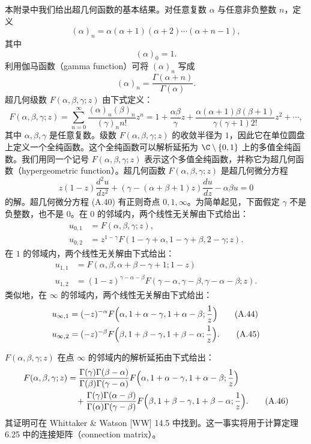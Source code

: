 
本附录中我们给出超几何函数的基本结果。对任意复数 $\alpha$ 与任意非负整数 $n$，定义
\[
(\alpha)_n=\alpha(\alpha+1)(\alpha+2)\cdots(\alpha+n-1),
\]
其中
\[
(\alpha)_0=1.
\]
利用伽马函数（gamma function）可将 $(\alpha)_n$ 写成
\[
(\alpha)_n=\frac{\Gamma(\alpha+n)}{\Gamma(\alpha)}.
\]
超几何级数 $F(\alpha,\beta,\gamma;z)$ 由下式定义：
\begin{equation}
F(\alpha,\beta,\gamma;z)=\sum_{n=0}^{\infty}\frac{(\alpha)_n(\beta)_n}{(\gamma)_nn!}z^n=1+\frac{\alpha\beta}{\gamma}z+\frac{\alpha(\alpha+1)\beta(\beta+1)}{\gamma(\gamma+1)2!}z^2+\cdots,\tag{A.39}
\end{equation}
其中 $\alpha,\beta,\gamma$ 是任意复数。级数 $F(\alpha,\beta,\gamma;z)$ 的收敛半径为 $1$，因此它在单位圆盘上定义一个全纯函数。这个全纯函数可以解析延拓为 $\C\setminus\{0,1\}$ 上的多值全纯函数。我们用同一个记号 $F(\alpha,\beta,\gamma;z)$ 表示这个多值全纯函数，并称它为超几何函数（hypergeometric function）。超几何函数 $F(\alpha,\beta,\gamma;z)$ 是超几何微分方程
\begin{equation}
z(1-z)\frac{d^2u}{dz^2}+(\gamma-(\alpha+\beta+1)z)\frac{du}{dz}-\alpha\beta u=0\tag{A.40}
\end{equation}
的解。超几何微分方程 (A.40) 有正则奇点 $0,1,\infty$。为简单起见，下面假定 $\gamma$ 不是负整数，也不是 $0$。在 $0$ 的邻域内，两个线性无关解由下式给出：
\begin{align}
u_{0,1}&=F(\alpha,\beta,\gamma;z),\nonumber\\
u_{0,2}&=z^{1-\gamma}F(1-\gamma+\alpha,1-\gamma+\beta,2-\gamma;z).\tag{A.41}
\end{align}
在 $1$ 的邻域内，两个线性无关解由下式给出：
\begin{align}
u_{1,1}&=F(\alpha,\beta,\alpha+\beta-\gamma+1;1-z)\tag{A.42}\\
u_{1,2}&=(1-z)^{\gamma-\alpha-\beta}F(\gamma-\alpha,\gamma-\beta,\gamma-\alpha-\beta;z).\tag{A.43}
\end{align}
类似地，在 $\infty$ 的邻域内，两个线性无关解由下式给出：
\begin{align}
u_{\infty,1}&=(-z)^{-\alpha}F\Bigl(\alpha,1+\alpha-\gamma,1+\alpha-\beta;\frac{1}{z}\Bigr)\tag{A.44}\\
u_{\infty,2}&=(-z)^{-\beta}F\Bigl(\beta,1+\beta-\gamma,1+\beta-\alpha;\frac{1}{z}\Bigr).\tag{A.45}
\end{align}

$F(\alpha,\beta,\gamma;z)$ 在点 $\infty$ 的邻域内的解析延拓由下式给出：
\begin{align}
F(\alpha,\beta,\gamma;z)&=\frac{\Gamma(\gamma)\Gamma(\beta-\alpha)}{\Gamma(\beta)\Gamma(\gamma-\alpha)}F\Bigl(\alpha,1+\alpha-\gamma,1+\alpha-\beta;\frac{1}{z}\Bigr)\nonumber\\
&\quad+\frac{\Gamma(\gamma)\Gamma(\alpha-\beta)}{\Gamma(\alpha)\Gamma(\gamma-\beta)}F\Bigl(\beta,1+\beta-\gamma,1+\beta-\alpha;\frac{1}{z}\Bigr).\tag{A.46}
\end{align}
其证明可在 Whittaker \& Watson [WW] 14.5 中找到。这一事实将用于计算定理 6.25 中的连接矩阵（connection matrix）。

